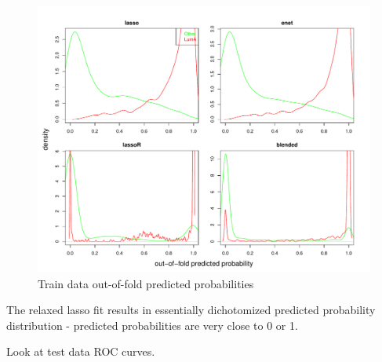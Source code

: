 \documentclass[
]{book}
\begin{document}
\begin{figure}
\centering
\includegraphics{Static/figures/brcaRna-glmnetFit-trainOOFprops-1.pdf}
\caption{\label{fig:brcaRna-glmnetFit-trainOOFprops}Train data out-of-fold predicted probabilities}
\end{figure}

The relaxed lasso fit results in essentially dichotomized predicted probability
distribution - predicted probabilities are very close to 0 or 1.

Look at test data ROC curves.
\end{document}
